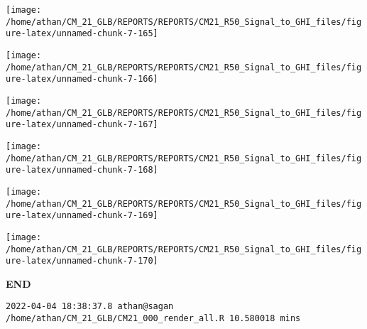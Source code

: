 \documentclass[
  11pt,
  a4paper,oneside]{article}
\begin{document}
\begin{center}\texttt{[image: /home/athan/CM\_21\_GLB/REPORTS/REPORTS/CM21\_R50\_Signal\_to\_GHI\_files/figure-latex/unnamed-chunk-7-165]} \end{center}

\begin{center}\texttt{[image: /home/athan/CM\_21\_GLB/REPORTS/REPORTS/CM21\_R50\_Signal\_to\_GHI\_files/figure-latex/unnamed-chunk-7-166]} \end{center}

\begin{center}\texttt{[image: /home/athan/CM\_21\_GLB/REPORTS/REPORTS/CM21\_R50\_Signal\_to\_GHI\_files/figure-latex/unnamed-chunk-7-167]} \end{center}

\begin{center}\texttt{[image: /home/athan/CM\_21\_GLB/REPORTS/REPORTS/CM21\_R50\_Signal\_to\_GHI\_files/figure-latex/unnamed-chunk-7-168]} \end{center}

\begin{center}\texttt{[image: /home/athan/CM\_21\_GLB/REPORTS/REPORTS/CM21\_R50\_Signal\_to\_GHI\_files/figure-latex/unnamed-chunk-7-169]} \end{center}

\begin{center}\texttt{[image: /home/athan/CM\_21\_GLB/REPORTS/REPORTS/CM21\_R50\_Signal\_to\_GHI\_files/figure-latex/unnamed-chunk-7-170]} \end{center}

\textbf{END}

\begin{verbatim}
2022-04-04 18:38:37.8 athan@sagan /home/athan/CM_21_GLB/CM21_000_render_all.R 10.580018 mins
\end{verbatim}
\end{document}
